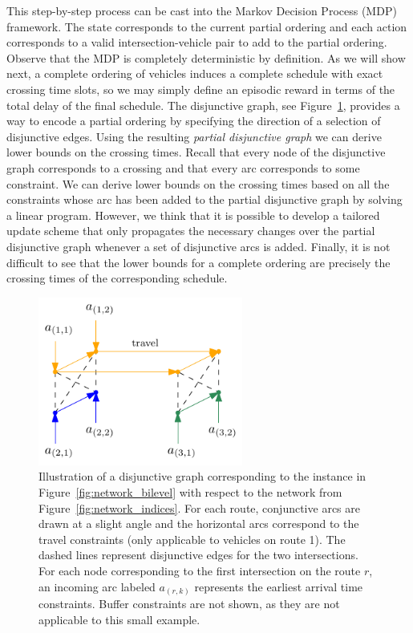 \documentclass[notitlepage]{report}
\begin{document}
This step-by-step process can be cast into the Markov Decision Process (MDP)
framework.
The state corresponds to the current partial ordering and each action
corresponds to a valid intersection-vehicle pair to add to the partial ordering.
Observe that the MDP is completely deterministic by definition. As we will show
next, a complete ordering of vehicles induces a complete schedule with exact
crossing time slots, so we may simply define an episodic reward in terms of the
total delay of the final schedule.
The disjunctive graph, see Figure~\ref{fig:disjunctive_graph}, provides a way to
encode a partial ordering by specifying the direction of a selection of
disjunctive edges.
Using the resulting \textit{partial disjunctive graph} we can derive lower bounds on the crossing
times. Recall that every node of the disjunctive graph corresponds to a crossing
and that every arc corresponds to some constraint. We can derive lower bounds on
the crossing times based on all the constraints whose arc has been added to the
partial disjunctive graph by solving a linear program.
However, we think that it is possible to develop a tailored update scheme that
only propagates the necessary changes over the partial disjunctive graph
whenever a set of disjunctive arcs is added.
Finally, it is not difficult to see that the lower bounds for a complete ordering are
precisely the crossing times of the corresponding schedule.

\begin{figure}[h]
  \centering
  \includegraphics[width=0.6\textwidth]{figures/disjunctive_graph.pdf}
  \caption{Illustration of a disjunctive graph corresponding to the instance in
    Figure~\ref{fig:network_bilevel} with respect to the network from
    Figure~\ref{fig:network_indices}. For each route, conjunctive arcs are drawn
    at a slight angle and the horizontal arcs correspond to the travel
    constraints (only applicable to vehicles on route 1). The dashed lines
    represent disjunctive edges for the two intersections. For each node
    corresponding to the first intersection on the route $r$, an incoming arc
    labeled $a_{(r,k)}$ represents the earliest arrival time constraints. Buffer
    constraints are not shown, as they are not applicable to this small
    example.}
  \label{fig:disjunctive_graph}
\end{figure}
\end{document}
